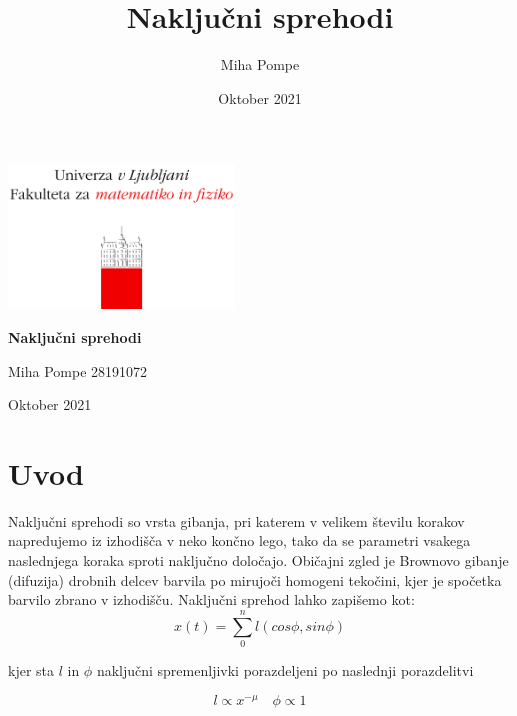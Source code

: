 \documentclass[12pt, a4paper]{article}
\title{Naključni sprehodi}
\author{Miha Pompe}
\date{Oktober 2021}
\begin{document}
\begin{titlepage}
	\centering
 	\includegraphics[width=0.45\textwidth]{logo_fmf_uni-lj_sl_veliki.png}\par\vspace{1cm}

	\vspace{1cm}

	\vspace{1.5cm}
	{\huge\bfseries Naključni sprehodi\par}
	\vspace{2cm}
	{\Large Miha Pompe 28191072\par}
	\vfill

	\vfill

	{\large Oktober 2021\par}
\end{titlepage}
\thispagestyle{empty}
\clearpage
{}
\newpage


\section{Uvod}
Naključni sprehodi so vrsta gibanja, pri katerem v velikem številu korakov napredujemo iz izhodišča v neko končno lego, tako da se parametri vsakega naslednjega koraka sproti naključno določajo. 
Običajni zgled je Brownovo gibanje (difuzija) drobnih delcev barvila po mirujoči homogeni tekočini, kjer je spočetka barvilo zbrano v izhodišču. Naključni sprehod lahko zapišemo kot:
\begin{equation*}
  x(t) = \sum_0^n l (cos\phi, sin\phi)
\end{equation*}

kjer sta $l$ in $\phi$ naključni spremenljivki porazdeljeni po naslednji porazdelitvi

\begin{equation*}
  l \propto x^{-\mu} \quad \phi \propto 1
\end{equation*}
\end{document}
